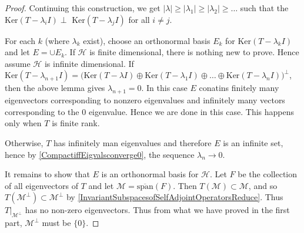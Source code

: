 \begin{proof}
  Continuing this construction, we get $|\lambda| \ge |\lambda_1| \ge
  |\lambda_2| \ge \ldots$ such that the $\textrm{Ker}(T - \lambda_iI)
  \perp \textrm{ Ker}(T - \lambda_j I)$ for all $i \neq j$.

  For each $k$ (where $\lambda_k$ exist), choose an orthonormal basis
  $E_k$ for $\textrm{Ker}(T - \lambda_k I)$ and let $E = \cup E_k$.
  If $\mathcal{H}$ is finite dimensional, there is nothing new to
  prove. Hence assume $\mathcal{H}$ is infinite dimensional. If
  $\textrm{Ker}(T - \lambda_{n+1}I) = \big(\textrm{Ker}(T - \lambda
    I) \oplus \textrm{Ker}(T - \lambda_1 I ) \oplus \ldots \oplus
  \textrm{Ker}(T - \lambda_{n} I) \big)^\perp$, then the above lemma
  gives $\lambda_{n+1} = 0$. In this case $E$ conatins finitely many
  eigenvectors corresponding to nonzero eigenvalues and infinitely
  many vectors corresponding to the $0$ eigenvalue. Hence we are done
  in this case. This happens only when $T$ is finite rank.

  Otherwise, $T$ has infinitely man eigenvalues and therefore $E$ is
  an infinite set, hence by \autoref{CompactiffEigvalsconverge0},  the sequence
  $\lambda_n \to 0$.

  It remains to show that $E$ is an orthonormal basis for
  $\mathcal{H}$. Let $F$ be the collection of all eigenvectors of $T$
  and let $\mathcal{M} = \overline{ \textrm{span}}(F)$.
  Then $T(\mathcal{M}) \subset \mathcal{M}$, and so
  $T(\mathcal{M}^\perp) \subset \mathcal{M}^\perp$ by
  \autoref{InvariantSubspacesofSelfAdjointOperatorsReduce}. Thus
  $T|_{\mathcal{ M}^\perp}$ has no non-zero eigenvectors. Thus from
  what we have proved in the first part, $\mathcal{M}^\perp$ must be $\{ 0 \}$.
\end{proof}

